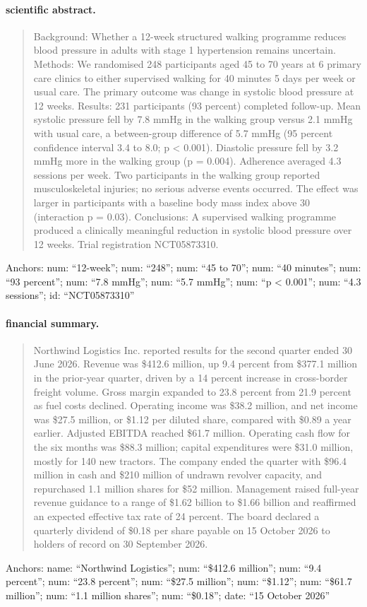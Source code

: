 \paragraph{scientific abstract.}
\begin{quote}\small Background: Whether a 12-week structured walking programme reduces blood pressure in adults with stage 1 hypertension remains uncertain. Methods: We randomised 248 participants aged 45 to 70 years at 6 primary care clinics to either supervised walking for 40 minutes 5 days per week or usual care. The primary outcome was change in systolic blood pressure at 12 weeks. Results: 231 participants (93 percent) completed follow-up. Mean systolic pressure fell by 7.8 mmHg in the walking group versus 2.1 mmHg with usual care, a between-group difference of 5.7 mmHg (95 percent confidence interval 3.4 to 8.0; p < 0.001). Diastolic pressure fell by 3.2 mmHg more in the walking group (p = 0.004). Adherence averaged 4.3 sessions per week. Two participants in the walking group reported musculoskeletal injuries; no serious adverse events occurred. The effect was larger in participants with a baseline body mass index above 30 (interaction p = 0.03). Conclusions: A supervised walking programme produced a clinically meaningful reduction in systolic blood pressure over 12 weeks. Trial registration NCT05873310.\end{quote}
\noindent\footnotesize Anchors: num: ``12-week''; num: ``248''; num: ``45 to 70''; num: ``40 minutes''; num: ``93 percent''; num: ``7.8 mmHg''; num: ``5.7 mmHg''; num: ``p < 0.001''; num: ``4.3 sessions''; id: ``NCT05873310''\normalsize

\paragraph{financial summary.}
\begin{quote}\small Northwind Logistics Inc. reported results for the second quarter ended 30 June 2026. Revenue was \$412.6 million, up 9.4 percent from \$377.1 million in the prior-year quarter, driven by a 14 percent increase in cross-border freight volume. Gross margin expanded to 23.8 percent from 21.9 percent as fuel costs declined. Operating income was \$38.2 million, and net income was \$27.5 million, or \$1.12 per diluted share, compared with \$0.89 a year earlier. Adjusted EBITDA reached \$61.7 million. Operating cash flow for the six months was \$88.3 million; capital expenditures were \$31.0 million, mostly for 140 new tractors. The company ended the quarter with \$96.4 million in cash and \$210 million of undrawn revolver capacity, and repurchased 1.1 million shares for \$52 million. Management raised full-year revenue guidance to a range of \$1.62 billion to \$1.66 billion and reaffirmed an expected effective tax rate of 24 percent. The board declared a quarterly dividend of \$0.18 per share payable on 15 October 2026 to holders of record on 30 September 2026.\end{quote}
\noindent\footnotesize Anchors: name: ``Northwind Logistics''; num: ``\$412.6 million''; num: ``9.4 percent''; num: ``23.8 percent''; num: ``\$27.5 million''; num: ``\$1.12''; num: ``\$61.7 million''; num: ``1.1 million shares''; num: ``\$0.18''; date: ``15 October 2026''\normalsize

